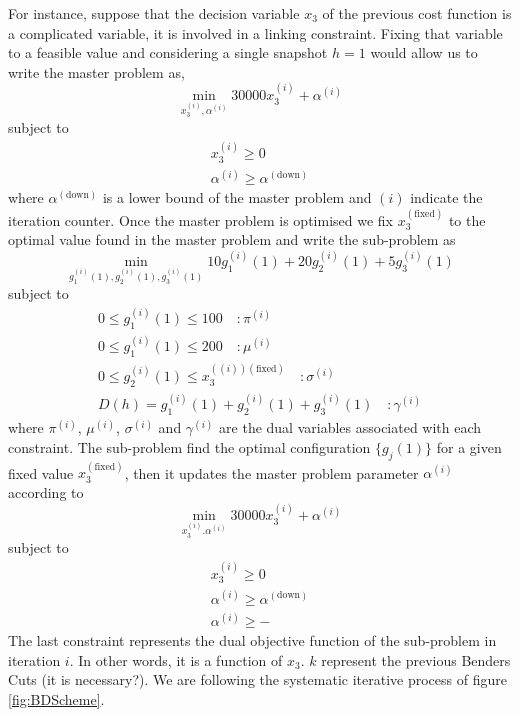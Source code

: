 For instance, suppose that the decision variable $x_{3}$ of the previous cost function is a complicated variable, it is involved in a linking constraint. Fixing that variable to a feasible value and considering a single snapshot $h=1$ would allow us to write the master problem as,
\begin{equation}
    \min_{x_{3}^{(i)}, \alpha^{(i)}} 30000x_{3}^{(i)} + \alpha^{(i)}
\end{equation}
subject to
\begin{align}
    x_{3}^{(i)} \geq 0 \\
    \alpha^{(i)} \geq \alpha^{(\text{down})}
\end{align}
where $\alpha^{(\text{down})}$ is a lower bound of the master problem and $(i)$ indicate the iteration counter. Once the master problem is optimised we fix $x_{3}^{(\text{fixed})}$ to the optimal value found in the master problem and write the sub-problem as
\begin{equation}
    \min_{g_{1}^{(i)}(1), g_{2}^{(i)}(1), g_{3}^{(i)}(1)} 10g_{1}^{(i)}(1)+20g_{2}^{(i)}(1) + 5g_{3}^{(i)}(1)
\end{equation}
subject to
\begin{align}
    0 \leq g_{1}^{(i)}(1) \leq 100 \quad :\pi^{(i)} \\
    0 \leq g_{1}^{(i)}(1) \leq 200 \quad :\mu^{(i)} \\
    0 \leq g_{2}^{(i)}(1) \leq x_{3}^{((i))(\text{fixed})} \quad :\sigma^{(i)} \\
    D(h) = g_{1}^{(i)}(1) + g_{2}^{(i)}(1) + g_{3}^{(i)}(1) \quad :\gamma^{(i)}
\end{align}
where $\pi^{(i)}$, $\mu^{(i)}$, $\sigma^{(i)}$ and $\gamma^{(i)}$ are the dual variables associated with each constraint. The sub-problem find the optimal configuration $\{g_{j}(1)\}$ for a given fixed value $x_{3}^{(\text{fixed})}$, then it updates the master problem parameter $\alpha^{(i)}$ according to
\begin{equation}
    \min_{x_{3}^{(i)}. \alpha^{(i)}} 30000x_{3}^{(i)} + \alpha^{(i)}
\end{equation}
subject to
\begin{align}
    x_{3}^{(i)} \geq 0 \\
    \alpha^{(i)} \geq \alpha^{(\text{down})}\\
    \alpha^{(i)} \geq -\
\end{align}
The last constraint represents the dual objective function of the sub-problem in iteration $i$. In other words, it is a function of $x_{3}$. $k$ represent the previous Benders Cuts (it is necessary?). We are following the systematic iterative process of figure \ref{fig:BDScheme}.
